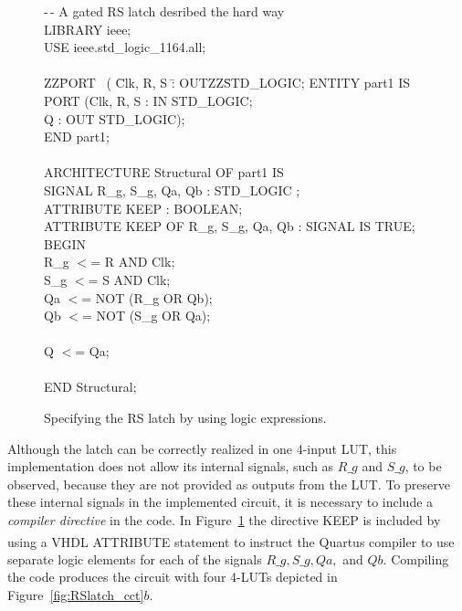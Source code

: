 \documentclass[epsfig,10pt,fullpage]{article}
\begin{document}
\begin{figure}[H]
\begin{center}
\begin{minipage}[t]{12.5 cm}
\begin{tabbing}
-\,- A gated RS latch desribed the hard way\\
LIBRARY ieee;\\
USE ieee.std\_logic\_1164.all;\\
\\
ZZ\=PORT ~( \=Clk, R, S	\=: OUTZZ\=STD\_LOGIC;\kill
ENTITY part1 IS\\
\>PORT (\>Clk, R, S \>: IN	\>STD\_LOGIC;\\
\>\>Q \>: OUT \>STD\_LOGIC);\\
END part1;\\
\\
ARCHITECTURE Structural OF part1 IS\\
\>SIGNAL R\_g, S\_g, Qa, Qb : STD\_LOGIC ;\\
\>ATTRIBUTE KEEP : BOOLEAN;\\
\>ATTRIBUTE KEEP OF R\_g, S\_g, Qa, Qb : SIGNAL IS TRUE;\\
BEGIN	\\
\>R\_g $<$= R AND Clk;\\
\>S\_g $<$= S AND Clk;\\
\>Qa $<$= NOT (R\_g OR Qb);\\
\>Qb $<$= NOT (S\_g OR Qa);\\
~\\
\>Q $<$= Qa;\\
~\\
END Structural;
\end{tabbing}
\end{minipage}
\end{center}
\caption{Specifying the RS latch by using logic expressions.}
\label{fig:latch_code}
\end{figure}

Although the latch can be correctly realized in one 4-input LUT, this implementation
does not allow its internal signals, such as $R\_g$ and $S\_g$, to be observed, because
they are not provided as outputs from the LUT. To preserve these internal signals in 
the implemented circuit, it is necessary to include a {\it compiler
directive} in the code.  In Figure~\ref{fig:latch_code} the directive KEEP is
included by using a VHDL ATTRIBUTE statement to instruct the Quartus\textsuperscript{\textregistered} compiler to use separate logic elements for each of
the signals $R\_g, S\_g, Qa,$ and $Qb$. Compiling the code produces the circuit with four
4-LUTs depicted in Figure~\ref{fig:RSlatch_cct}$b$. 
\end{document}
